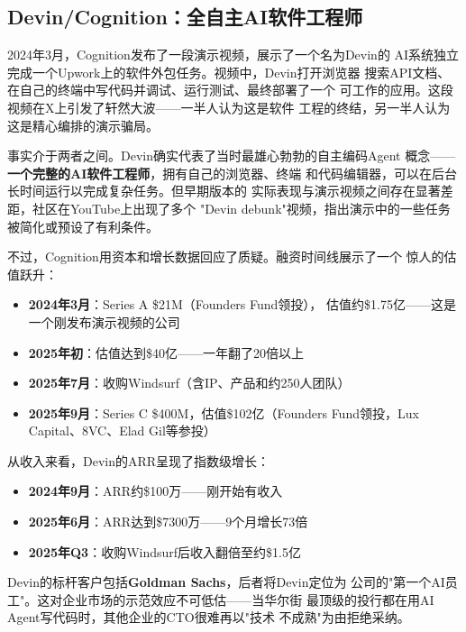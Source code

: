 \subsection{Devin/Cognition：全自主AI软件工程师}
\label{subsec:devin}

2024年3月，Cognition发布了一段演示视频，展示了一个名为Devin的
AI系统独立完成一个Upwork上的软件外包任务。视频中，Devin打开浏览器
搜索API文档、在自己的终端中写代码并调试、运行测试、最终部署了一个
可工作的应用。这段视频在X上引发了轩然大波——一半人认为这是软件
工程的终结，另一半人认为这是精心编排的演示骗局。

事实介于两者之间。Devin确实代表了当时最雄心勃勃的自主编码Agent
概念——\textbf{一个完整的AI软件工程师}，拥有自己的浏览器、终端
和代码编辑器，可以在后台长时间运行以完成复杂任务。但早期版本的
实际表现与演示视频之间存在显著差距，社区在YouTube上出现了多个
"Devin debunk"视频，指出演示中的一些任务被简化或预设了有利条件。

不过，Cognition用资本和增长数据回应了质疑。融资时间线展示了一个
惊人的估值跃升：

\begin{itemize}
  \item \textbf{2024年3月}：Series A \$21M（Founders Fund领投），
    估值约\$1.75亿——这是一个刚发布演示视频的公司
  \item \textbf{2025年初}：估值达到\$40亿——一年翻了20倍以上
  \item \textbf{2025年7月}：收购Windsurf（含IP、产品和约250人团队）
  \item \textbf{2025年9月}：Series C \$400M，估值\$102亿（Founders
    Fund领投，Lux Capital、8VC、Elad Gil等参投）
\end{itemize}

从收入来看，Devin的ARR呈现了指数级增长：
\begin{itemize}
  \item \textbf{2024年9月}：ARR约\$100万——刚开始有收入
  \item \textbf{2025年6月}：ARR达到\$7300万——9个月增长73倍
  \item \textbf{2025年Q3}：收购Windsurf后收入翻倍至约\$1.5亿
\end{itemize}

Devin的标杆客户包括\textbf{Goldman Sachs}，后者将Devin定位为
公司的"第一个AI员工"。这对企业市场的示范效应不可低估——当华尔街
最顶级的投行都在用AI Agent写代码时，其他企业的CTO很难再以"技术
不成熟"为由拒绝采纳。

